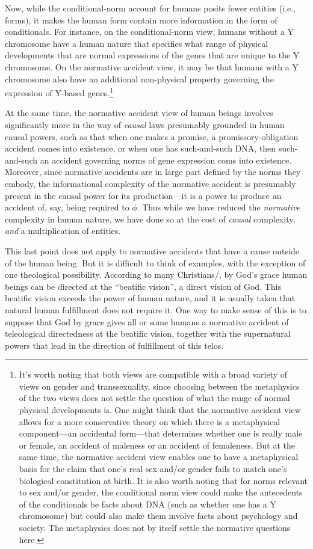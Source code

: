 Now, while the conditional-norm account for humans
posits fewer entities (i.e., forms), it makes the human form contain more information in the form of conditionals.
For instance, on the conditional-norm view, humans without a Y chromosome have a human nature that specifies what
range of physical developments that are normal expressions of the genes that are unique to the Y chromosome. On the 
normative accident view, it may be that humans with a Y chromosome also have an additional non-physical property governing
the expression of Y-based genes.\footnote{It's worth noting that both views are compatible with a broad variety of views on gender and 
transsexuality, since choosing between the metaphysics of the two views does not settle the question of what the range
of normal physical developments is. One might think that the normative accident view allows for a more conservative
theory on which there is a metaphysical component---an accidental form---that determines whether one is really male or female, 
an accident of maleness or an accident of femaleness.  But at the same time, the normative accident view enables one to have 
a metaphysical basis for the claim that one's real sex and/or gender fails to match one's biological constitution at birth.
It is also worth noting that for norms relevant to sex and/or gender, the conditional norm view could make the antecedents 
of the conditionals be facts about DNA (such as whether one has a Y chromosome) but could also make them involve facts about 
psychology and society. The metaphysics does not by itself settle the normative questions here.}

At the same time, the normative accident view of human beings involves significantly more in the way of \textit{causal} laws
presumably grounded in human causal powers, such as that when one makes a promise, a promissory-obligation
accident comes into existence, or when one has such-and-such DNA, then such-and-such an accident governing norms of gene expression
coms into existence. Moreover, since normative accidents are in large part defined by the norms they embody, the informational
complexity of the normative accident is presumably present in the causal power for its production---it is a power to produce an
accident of, say, being required to $\phi$.  Thus while we have reduced the \textit{normative} complexity in human nature, we have done 
so at the cost of \textit{causal} complexity, \textit{and} a multiplication of entities.

This last point does not apply to normative accidents that have a cause outside of the human being. But it is difficult to think
of examples, with the exception of one theological possibility. According to many Christians/, by God's grace human beings
can be directed at the ``beatific vision'', a direct vision of God. This beatific vision exceeds the power of human
nature, and it is usually taken that natural human fulfillment does not require it. One way to make sense of this is to suppose
that God by grace gives all or some humans a normative accident of teleological directedness at the beatific vision, together
with the supernatural powers that lead in the direction of fulfillment of this telos. 


